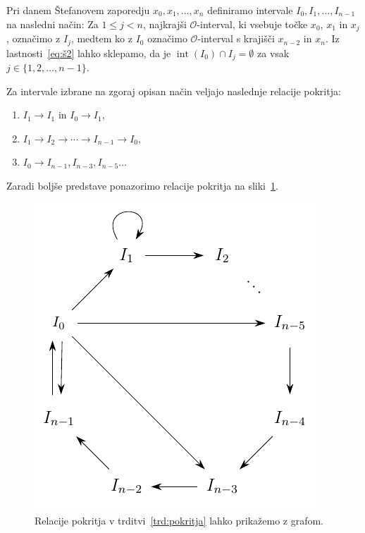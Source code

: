 \documentclass[mat2]{fmfdelo}
\DeclareMathOperator{\interior}{int}
\begin{document}
Pri danem Štefanovem zaporedju $x_0, x_1, \dots, x_n$ definiramo intervale $I_0, I_1, \dots, I_{n-1}$ na  nasledni način: Za $1 \leq j < n$, najkrajši $\mathcal{O}$-interval, ki vsebuje točke $x_0$, $x_1$ in $x_j$, označimo z $I_j$, medtem ko z $I_0$ označimo $\mathcal{O}$-interval s krajišči $x_{n-2}$ in $x_n$. Iz lastnosti~\ref{eq:š2} lahko sklepamo, da je $\interior(I_0) \cap I_j = \emptyset$ za vsak $j \in \{1, 2, \dots, n-1\}$.

\begin{trditev}\label{trd:pokritja}
Za intervale izbrane na zgoraj opisan način veljajo naslednje relacije pokritja:
\begin{enumerate}[label={(\arabic*)}]
\item $I_1 \to I_1$ in $I_0 \to I_1$,\label{trd:pokritja1}
\item $I_1 \to I_2 \to \cdots \to I_{n-1} \to I_0$,\label{trd:pokritja2}
\item $I_0 \to I_{n-1}, I_{n-3}, I_{n-5} \dots $\label{trd:pokritja3}
\end{enumerate}
Zaradi boljše predstave ponazorimo relacije pokritja na sliki~\ref{fig:nkotnik}.
\end{trditev}

\begin{figure}[h]
  \centering
  \includegraphics{images/graph_n.pdf}
  \caption[Primer vektorske slike.]{Relacije pokritja v trditvi~\ref{trd:pokritja} lahko prikažemo z grafom.}
  \label{fig:nkotnik}
\end{figure}
\end{document}
